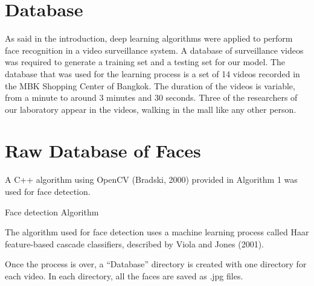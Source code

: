 \section{Database}
As said in the introduction, deep learning algorithms were applied to perform face recognition in a video surveillance system. A database of surveillance videos was required to generate a training set and a testing set for our model.
The database that was used for the learning process is a set of 14 videos recorded in the MBK Shopping Center of Bangkok. The duration of the videos is variable, from a minute to around 3 minutes and 30 seconds. Three of the researchers of our laboratory appear in the videos, walking in the mall like any other person.

\section{Raw Database of Faces}

A C++ algorithm using OpenCV (Bradski, 2000) provided in Algorithm 1 was used for face detection.

\begin{algorithm}[H]
 \caption{Face detection Algorithm}
\end{algorithm}

The algorithm used for face detection uses a machine learning process called Haar feature-based cascade classifiers, described by Viola and Jones (2001).

Once the process is over, a \enquote{Database} directory is created with one directory for each video. In each directory, all the faces are saved as .jpg files.

